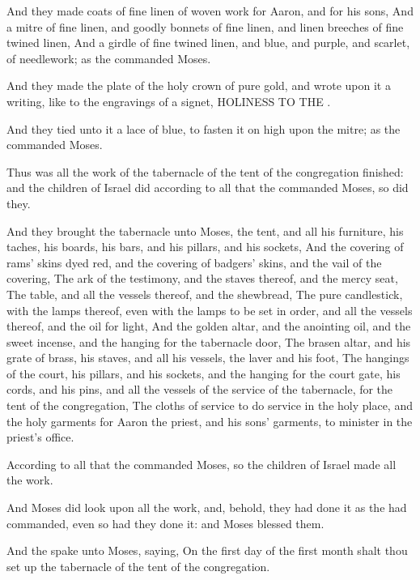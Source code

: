 \Verse And they made coats of fine linen of woven work for Aaron, and for his sons, \Verse And a mitre of fine linen, and goodly bonnets of fine linen, and linen breeches of fine twined linen, \Verse And a girdle of fine twined linen, and blue, and purple, and scarlet, of needlework; as the \LORD commanded Moses.

\Verse And they made the plate of the holy crown of pure gold, and wrote upon it a writing, like to the engravings of a signet, HOLINESS TO THE \LORD.

\Verse And they tied unto it a lace of blue, to fasten it on high upon the mitre; as the \LORD commanded Moses.

\Verse Thus was all the work of the tabernacle of the tent of the congregation finished: and the children of Israel did according to all that the \LORD commanded Moses, so did they.

\Verse And they brought the tabernacle unto Moses, the tent, and all his furniture, his taches, his boards, his bars, and his pillars, and his sockets, \Verse And the covering of rams' skins dyed red, and the covering of badgers' skins, and the vail of the covering, \Verse The ark of the testimony, and the staves thereof, and the mercy seat, \Verse The table, and all the vessels thereof, and the shewbread, \Verse The pure candlestick, with the lamps thereof, even with the lamps to be set in order, and all the vessels thereof, and the oil for light, \Verse And the golden altar, and the anointing oil, and the sweet incense, and the hanging for the tabernacle door, \Verse The brasen altar, and his grate of brass, his staves, and all his vessels, the laver and his foot, \Verse The hangings of the court, his pillars, and his sockets, and the hanging for the court gate, his cords, and his pins, and all the vessels of the service of the tabernacle, for the tent of the congregation, \Verse The cloths of service to do service in the holy place, and the holy garments for Aaron the priest, and his sons' garments, to minister in the priest's office.

\Verse According to all that the \LORD commanded Moses, so the children of Israel made all the work.

\Verse And Moses did look upon all the work, and, behold, they had done it as the \LORD had commanded, even so had they done it: and Moses blessed them.

\Chapter
\Verse And the \LORD spake unto Moses, saying, \Verse On the first day of the first month shalt thou set up the tabernacle of the tent of the congregation.

